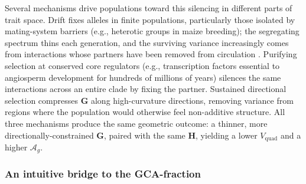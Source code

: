 \documentclass[9pt,twocolumn,twoside,lineno]{gsajnl}
\newcommand{\mat}[1]{\mathbf{#1}}
\newcommand{\Ag}{\ensuremath{\mathcal{A}_{g}}\xspace}
\newcommand{\Vquad}{\ensuremath{V_{\text{quad}}}\xspace}
\begin{document}
Several mechanisms drive populations toward this silencing in different parts of trait space. Drift fixes alleles in finite populations, particularly those isolated by mating-system barriers (e.g., heterotic groups in maize breeding); the segregating spectrum thins each generation, and the surviving variance increasingly comes from interactions whose partners have been removed from circulation \citep{Technow2021}. Purifying selection at conserved core regulators (e.g., transcription factors essential to angiosperm development for hundreds of millions of years) silences the same interactions across an entire clade by fixing the partner. Sustained directional selection compresses $\mat{G}$ along high-curvature directions, removing variance from regions where the population would otherwise feel non-additive structure. All three mechanisms produce the same geometric outcome: a thinner, more directionally-constrained $\mat{G}$, paired with the same $\mat{H}$, yielding a lower $\Vquad$ and a higher \Ag.

\subsubsection*{An intuitive bridge to the GCA-fraction}
\end{document}
